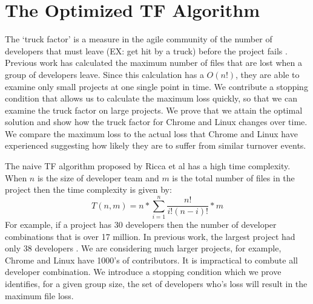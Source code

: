 \documentclass[12pt, a4paper, openright]{report}
\begin{document}
\section*{The Optimized TF Algorithm}
The `truck factor' is a measure in the agile community of the number of developers that must leave (EX: get hit by a truck) before the project fails \cite{Torchiano2011Wetsom}. Previous work has calculated the maximum number of files
that are lost when a group of developers leave. Since this calculation has a
$O(n!)$, they are able to examine only small projects at one single point in time.
We contribute a stopping condition that allows us to calculate the maximum loss
quickly, so that we can examine the truck factor on large projects. We prove
that we attain the optimal solution and show how the truck factor for Chrome and
Linux changes over time. We compare the maximum loss to the actual loss that
Chrome and Linux have experienced suggesting how likely they are to suffer from
similar turnover events.

The naive TF algorithm proposed by Ricca et al \cite{Ricca2011PROFES} has a high time complexity.
When $n$ is the size of developer team and $m$ is the total number of files in the project then the time complexity is given by:
\begin{equation}T(n,m) = n*\sum_{i=1}^n \frac{n!}{i!(n-i)!}*m\end{equation}
For example, if a project has 30 developers then the number of developer combinations that is over 17 million.
In previous work, the largest project had only 38 developers
\cite{Torchiano2011Wetsom}. We are considering much larger projects, for
example, Chrome and Linux have 1000's of contributors. It is impractical to
combute all developer combination.
We introduce a stopping condition which we prove identifies, for a given group size, the set of developers who's loss will result in the maximum file loss.
\end{document}
